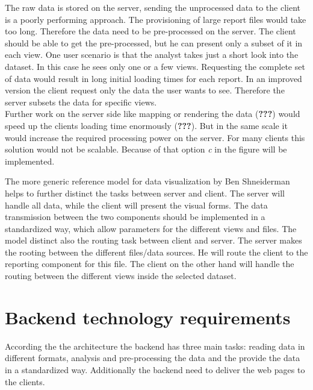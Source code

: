 \documentclass[american,a4paper,oneside,,tablecaptionabove]{scrbook}
\begin{document}
The raw data is stored on the server, sending the unprocessed data to
the client is a poorly performing approach. The provisioning of large
report files would take too long. Therefore the data need to be
pre-processed on the server. The client should be able to get the
pre-processed, but he can present only a subset of it in each view. One
user scenario is that the analyst takes just a short look into the
dataset. In this case he sees only one or a few views. Requesting the
complete set of data would result in long initial loading times for each
report. In an improved version the client request only the data the user
wants to see. Therefore the server subsets the data for specific
views.\\
Further work on the server side like mapping or rendering the data
({\textbf{???}}) would speed up the clients loading time enormously
({\textbf{???}}). But in the same scale it would increase the required
processing power on the server. For many clients this solution would not
be scalable. Because of that option \emph{c} in the figure will be
implemented.

The more generic reference model for data visualization by Ben
Shneiderman helps to further distinct the tasks between server and
client. The server will handle all data, while the client will present
the visual forms. The data transmission between the two components
should be implemented in a standardized way, which allow parameters for
the different views and files. The model distinct also the routing task
between client and server. The server makes the rooting between the
different files/data sources. He will route the client to the reporting
component for this file. The client on the other hand will handle the
routing between the different views inside the selected dataset.

\section{Backend technology
requirements}\label{backend-technology-requirements}

According the the architecture the backend has three main tasks: reading
data in different formats, analysis and pre-processing the data and the
provide the data in a standardized way. Additionally the backend need to
deliver the web pages to the clients.
\end{document}
